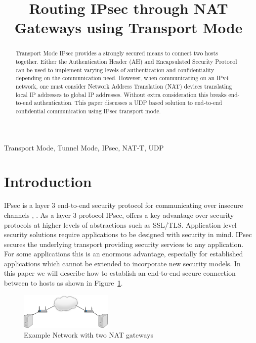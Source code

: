 \documentclass[conference,12pt]{IEEEtran}
\begin{document}
%
\title{Routing IPsec through NAT Gateways using Transport Mode}

\author{
}
\maketitle
\begin{abstract}
Transport Mode IPsec provides a strongly secured means to connect two hosts
together. Either the Authentication Header (AH) and Encapsulated Security
Protocol can be used to implement varying levels of authentication and
confidentiality depending on the communication need. However, when communicating
on an IPv4 network, one must consider Network Address Translation (NAT) devices
translating local IP addresses to global IP addresses. Without extra
consideration this breaks end-to-end authentication. This paper discusses 
a UDP based solution to end-to-end confidential communication using IPsec transport mode.
\end{abstract}

\begin{IEEEkeywords}
    Transport Mode, Tunnel Mode, IPsec, NAT-T, UDP
\end{IEEEkeywords}

\section{Introduction}
IPsec is a layer 3 end-to-end security protocol for communicating over insecure
channels \autocite{rfc4301}, \autocite{_osi_2014}. As a layer 3 protocol
IPsec, offers a key advantage over security protocols at higher levels of abstractions
such as SSL/TLS. Application level security solutions require applications to be
designed with security in mind. IPsec secures the underlying transport providing
security services to any application. For some applications this is an
enormous advantage, especially for established applications which cannot be
extended to incorporate new security models. In this paper we will describe 
how to establish an end-to-end secure connection between to hosts as shown in Figure~\ref{fig:network}.

\begin{figure}
\centering
\includegraphics[width=0.4\textwidth]{network.png}
\caption{Example Network with two NAT gateways}
\label{fig:network}
\end{figure}
\end{document}
